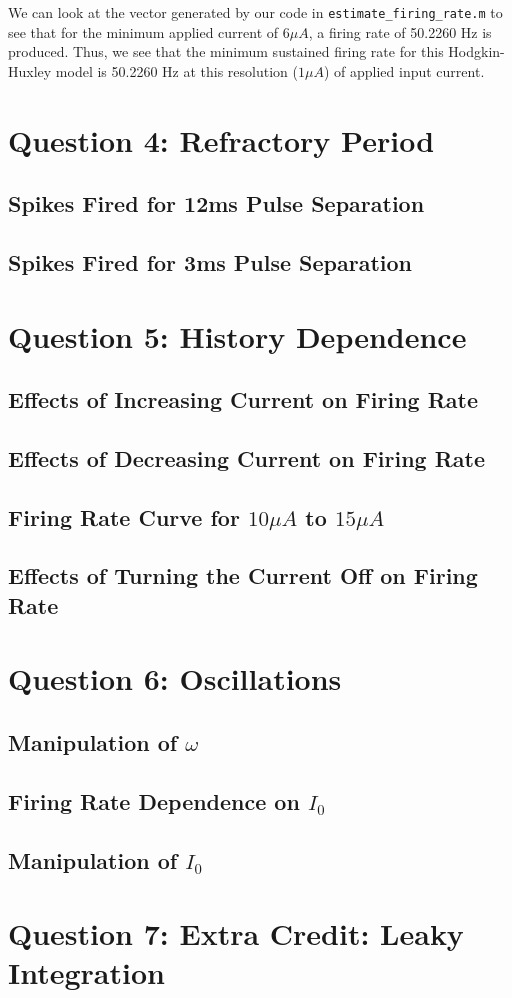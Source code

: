 \documentclass[11pt, oneside]{article}
\begin{document}
We can look at the vector generated by our code in \lstinline{estimate_firing_rate.m} to see that for the minimum applied current of $6\mu A$, a firing rate of 50.2260 Hz is produced. Thus, we see that the minimum sustained firing rate for this Hodgkin-Huxley model is 50.2260 Hz at this resolution ($1\mu A$) of applied input current.

\section{Question 4: Refractory Period}

\subsection{Spikes Fired for 12ms Pulse Separation}

\subsection{Spikes Fired for 3ms Pulse Separation}

\section{Question 5: History Dependence}

\subsection{Effects of Increasing Current on Firing Rate}

\subsection{Effects of Decreasing Current on Firing Rate}

\subsection{Firing Rate Curve for $10\mu A$ to $15\mu A$}

\subsection{Effects of Turning the Current Off on Firing Rate}

\section{Question 6: Oscillations}

\subsection{Manipulation of $\omega$}

\subsection{Firing Rate Dependence on $I_0$}

\subsection{Manipulation of $I_0$}

\section{Question 7: Extra Credit: Leaky Integration}
\end{document}
